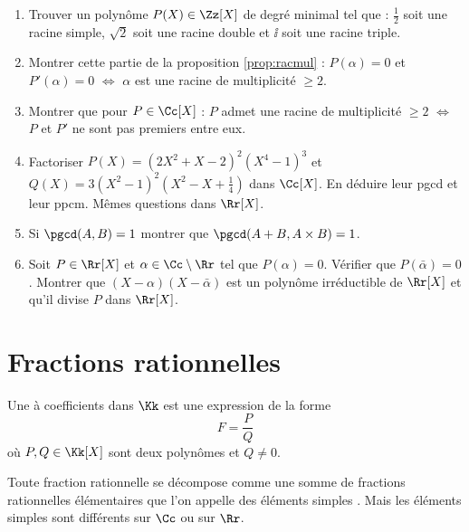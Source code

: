 \documentclass[class=report,crop=false]{standalone}
\begin{document}
\begin{miniexercices}
\sauteligne
\begin{enumerate}
  \item Trouver un polynôme $P(X) \in \Zz[X]$ de degré minimal tel que : $\frac 12$ soit une racine simple,
$\sqrt 2$ soit une racine double et $\ii$ soit une racine triple.

  \item Montrer cette partie de la proposition \ref{prop:racmul} :
\og$P(\alpha)=0$ et $P'(\alpha)=0$  $\iff$ $\alpha$ est une racine de multiplicité $\ge 2$\fg.

  \item Montrer que pour $P\in\Cc [X]$ :
\og$P$ admet une racine de multiplicité $\ge 2$ $\iff$ $P$ et $P'$ ne sont pas premiers entre eux\fg.

  \item Factoriser $P(X) = (2X^2+X-2)^2(X^4-1)^3$ et $Q(X)=3(X^2-1)^2(X^2-X+\frac14)$ dans $\Cc[X]$.
En déduire leur pgcd et leur ppcm. Mêmes questions dans $\Rr[X]$.

  \item Si $\pgcd(A,B)=1$ montrer que $\pgcd(A+B,A\times B)=1$.

  \item Soit $P\in \Rr[X]$ et $\alpha \in \Cc\setminus\Rr$ tel que $P(\alpha)=0$.
Vérifier que $P(\bar \alpha)=0$. Montrer que $(X-\alpha)(X-\bar\alpha)$ est un polynôme irréductible de $\Rr[X]$
et qu'il divise $P$ dans $\Rr[X]$.
\end{enumerate}
\end{miniexercices}


\section{Fractions rationnelles}

\begin{definition}
Une  à coefficients dans $\Kk$ est une expression
de la forme
$$F=\frac{P}{Q}$$
où $P,Q \in \Kk[X]$ sont deux polynômes et $Q \neq 0$.
\end{definition}


Toute fraction rationnelle se décompose comme une somme de fractions rationnelles
élémentaires que l'on appelle des \og éléments simples \fg. Mais les éléments simples
sont différents sur $\Cc$ ou sur $\Rr$.

\end{document}

